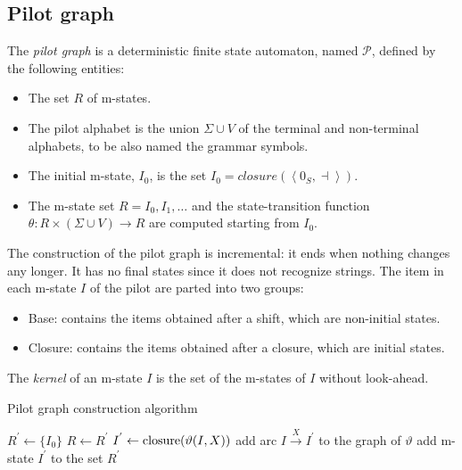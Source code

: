 \subsection*{Pilot graph}
\begin{definition}
    The \emph{pilot graph} is a deterministic finite state automaton, named $\mathcal{P}$, defined by the following entities:
    \begin{itemize}
        \item The set $R$ of m-states. 
        \item The pilot alphabet is the union $\Sigma\cup V$ of the terminal and non-terminal alphabets, to be also named the grammar symbols.
        \item The initial m-state, $I_0$, is the set $I_0=closure(\left\langle 0_S,\dashv \right\rangle )$. 
        \item The m-state set $R={I_0,I_1,\dots}$ and the state-transition function $\theta:R \times (\Sigma \cup V) \rightarrow R$ are computed starting from $I_0$. 
    \end{itemize}
\end{definition}
The construction of the pilot graph is incremental: it ends when nothing changes any longer. 
It has no final states since it does not recognize strings. 
The item in each m-state $I$ of the pilot are parted into two groups: 
\begin{itemize}
    \item Base: contains the items obtained after a shift, which are non-initial states.
    \item Closure: contains the items obtained after a closure, which are initial states.
\end{itemize}
\begin{definition}
    The \emph{kernel} of an m-state $I$ is the set of the m-states of $I$ without look-ahead. 
\end{definition}
\begin{algorithm}[H]
    \caption{Pilot graph construction algorithm}
        \begin{algorithmic}[1]
            \State $R^{'} \leftarrow \{I_0\}$
                \State $R \leftarrow R^{'}$
                    \State $I^{'} \leftarrow \textnormal{closure}(\vartheta(I,X))$
                        \State add arc $I \overset{X}{\rightarrow} I^{'}$ to the graph of $\vartheta$
                            \State add m-state $I^{'}$ to the set $R^{'}$
                        \EndIf
                    \EndIf
                \EndFor
            \EndWhile
        \end{algorithmic}
\end{algorithm}
